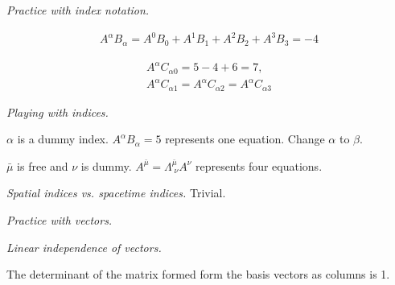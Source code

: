 \documentclass{report}
\begin{document}
\begin{subquests}
	\item \emph{Practice with index notation.}
	\begin{subquests}
		\item
		\begin{gather*}
			A^{\alpha}B_{\alpha} = A^{0}B_{0} + A^{1}B_{1} + A^{2}B_{2} + A^{3}B_{3} = -4 
		\end{gather*}
		
		\item
		\begin{gather*}
			A^{\alpha}C_{\alpha 0} = 5 - 4 + 6 = 7, \\
			A^{\alpha}C_{\alpha 1} = 
	 		A^{\alpha}C_{\alpha 2} = 
	 		A^{\alpha}C_{\alpha 3}  
		\end{gather*}

		\item 

		\item

		\item

		\item

		\item
	\end{subquests}

	\item \emph{Playing with indices.}
	\begin{subquests}
		\item $\alpha$ is a dummy index. $A^{\alpha}B_{\alpha} = 5$ represents one equation. Change $\alpha$ to $\beta$.

		\item $\bar{\mu}$ is free and $\nu$ is dummy. $A^{\bar \mu} = \Lambda^{\bar \mu}_{\;\nu} A^{\nu}$ represents four equations.

		\item

		\item

	\end{subquests}

	\item \emph{Spatial indices vs. spacetime indices.} Trivial.

	\item \emph{Practice with vectors.}

	\item \emph{Linear independence of vectors.}
	\begin{subquests}
		\item 
		The determinant of the matrix formed form the basis vectors as columns is 1.


\end{subquests}
\end{subquests}
\end{document}
